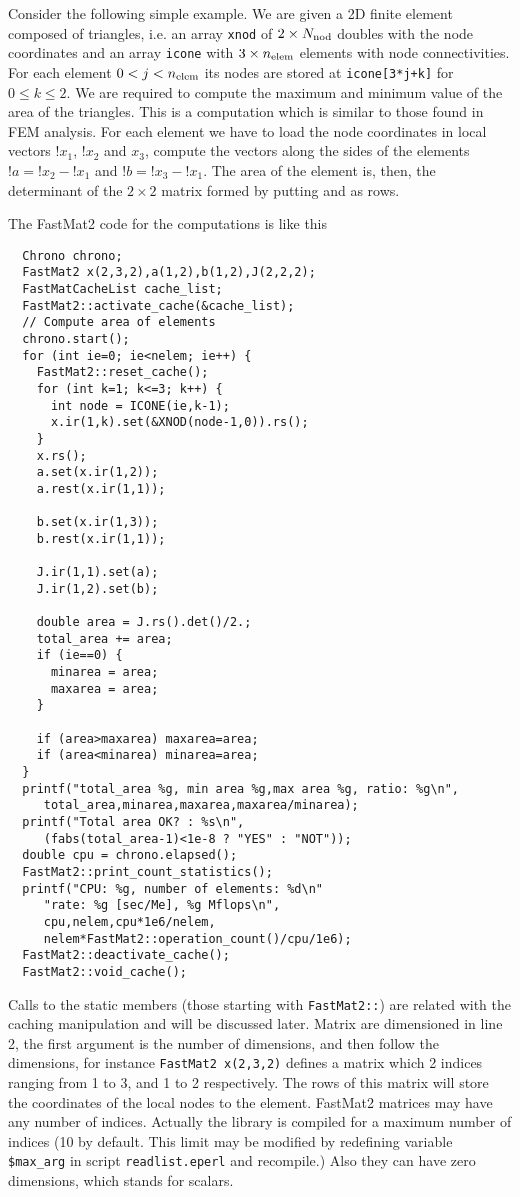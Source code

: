 Consider the following simple example. We are given a 2D finite
element composed of triangles, i.e. an array \verb+xnod+ of
$2\times{N_{\mathrm{nod}}}$ doubles with the node coordinates and an array
\verb+icone+ with $3\times{n_\mathrm{elem}}$ elements with node
connectivities. For each element $0<j<{n_\mathrm{elem}}$ its nodes are stored at
\verb|icone[3*j+k]| for $0\le k\le 2$. We are required to compute the
maximum and minimum value of the area of the triangles. This is a
computation which is similar to those found in FEM analysis. 
For each element we have to load the node coordinates in local vectors
$!x_1$, $!x_2$ and $x_3$, compute the vectors along the sides of the
elements $!a=!x_2-!x_1$ and $!b=!x_3-!x_1$. The area of the element
is, then, the determinant of the $2\times 2$ matrix  formed by
putting  and  as rows.

The FastMat2 code for the computations is like this

\begin{verbatim}
  Chrono chrono;
  FastMat2 x(2,3,2),a(1,2),b(1,2),J(2,2,2);
  FastMatCacheList cache_list;
  FastMat2::activate_cache(&cache_list);
  // Compute area of elements
  chrono.start();
  for (int ie=0; ie<nelem; ie++) {
    FastMat2::reset_cache();
    for (int k=1; k<=3; k++) {
      int node = ICONE(ie,k-1);
      x.ir(1,k).set(&XNOD(node-1,0)).rs();
    }
    x.rs();
    a.set(x.ir(1,2));
    a.rest(x.ir(1,1));

    b.set(x.ir(1,3));
    b.rest(x.ir(1,1));

    J.ir(1,1).set(a);
    J.ir(1,2).set(b);
    
    double area = J.rs().det()/2.;
    total_area += area;
    if (ie==0) {
      minarea = area;
      maxarea = area;
    }

    if (area>maxarea) maxarea=area;
    if (area<minarea) minarea=area;
  }
  printf("total_area %g, min area %g,max area %g, ratio: %g\n",
	 total_area,minarea,maxarea,maxarea/minarea);
  printf("Total area OK? : %s\n",
	 (fabs(total_area-1)<1e-8 ? "YES" : "NOT"));
  double cpu = chrono.elapsed();
  FastMat2::print_count_statistics();
  printf("CPU: %g, number of elements: %d\n"
	 "rate: %g [sec/Me], %g Mflops\n",
	 cpu,nelem,cpu*1e6/nelem,
	 nelem*FastMat2::operation_count()/cpu/1e6);
  FastMat2::deactivate_cache();
  FastMat2::void_cache();

\end{verbatim}

Calls to the static members (those starting with \verb+FastMat2::+)
are related with the caching manipulation and will be discussed
later. Matrix are dimensioned in line 2, the first argument is the
number of dimensions, and then follow the dimensions, for instance
\verb+FastMat2 x(2,3,2)+ defines a matrix which 2 indices ranging from
1 to 3, and 1 to 2 respectively. The rows of this matrix will store
the coordinates of the local nodes to the element. FastMat2 matrices
may have any number of indices. Actually the library is compiled for a
maximum number of indices (10 by default. This limit may be modified
by redefining variable {\tt\$max\_arg} in script \verb+readlist.eperl+
and recompile.) Also they can have zero dimensions, which stands for
scalars. 

